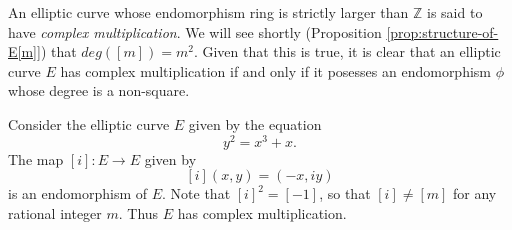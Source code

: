 



An elliptic curve whose endomorphism ring is strictly larger than $\mathbb{Z}$ is
said to have \emph{complex multiplication}.  We will see shortly (Proposition \ref{prop:structure-of-E[m]}) that $deg([m]) =
m^{2}$.  Given that this is true, it is clear that an elliptic curve $E$ has complex
multiplication if and only if it posesses an endomorphism $\phi$ whose degree is a non-square.

\begin{example}
  \label{ex:cm-example}
  Consider the elliptic curve $E$ given by the equation
  \begin{equation*}
    y^{2} = x^{3} + x.
  \end{equation*}
  The map $\left[ i \right] \colon E \rightarrow E$ given by
  \begin{equation*}
    \left[ i \right](x,y) = (-x,iy)
  \end{equation*}
  is an endomorphism of $E$.  Note that $\left[ i \right]^{2} = \left[ -1 \right]$,
  so that $\left[ i \right] \neq \left[ m \right]$ for any rational integer $m$.
  Thus $E$ has complex multiplication.
\end{example}


